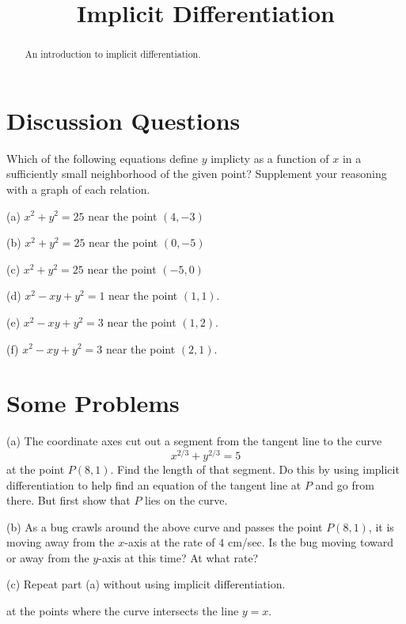 \documentclass{ximera}
\title{Implicit Differentiation}
\begin{document}
\begin{abstract}
An introduction to implicit differentiation.
\end{abstract}
\maketitle

\section*{Discussion Questions}

\begin{question}  \label{Q:dsftr4tr656t}
Which of the following equations define $y$ implicty as a function of $x$ in a sufficiently small neighborhood of the given point? Supplement your reasoning with a graph of each relation.

(a) $x^2 + y^2 = 25$ near the point $(4,-3)$

(b) $x^2 + y^2 = 25$ near the point $(0,-5)$

(c) $x^2 + y^2 = 25$ near the point $(-5,0)$

(d) $x^2 - xy + y^2 = 1$ near the point $(1,1)$.

(e) $x^2 - xy + y^2 = 3$ near the point $(1,2)$.

(f) $x^2 - xy + y^2 = 3$ near the point $(2,1)$.

\end{question}

\section*{Some Problems}


\begin{question}  \label{QPDDFDFgg}
(a) The coordinate axes cut out a segment from the tangent line to the curve
\[
     x^{2/3} + y^{2/3}= 5
\]
at the point $P(8,1)$. Find the length of that segment. Do this by using implicit differentiation to help find an equation of the tangent line at $P$ and go from there. But first show that $P$ lies on the curve.

(b) As a bug crawls around the above curve and passes the point $P(8,1)$, it is moving away from the $x$-axis at the rate of $4$ cm/sec. Is the bug moving toward or away from the $y$-axis at this time? At what rate?  

(c) Repeat part (a) without using implicit differentiation.

at the points where the curve intersects the line $y=x$.



\end{question}
\end{document}
